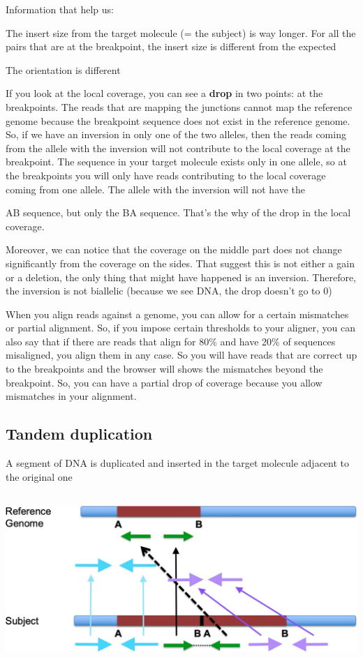 Information that help us:

The insert size from the target molecule (= the subject) is way longer. For all
the pairs that are at the breakpoint, the insert size is different from the
expected

The orientation is different

If you look at the local coverage, you can see a \textbf{drop} in two points: at
the breakpoints. The reads that are mapping the junctions cannot map the
reference genome because the breakpoint sequence does not exist in the reference
genome. So, if we have an inversion in only one of the two alleles, then the
reads coming from the allele with the inversion will not contribute to the local
coverage at the breakpoint. The sequence in your target molecule exists only in
one allele, so at the breakpoints you will only have reads contributing to the
local coverage coming from one allele. The allele with the inversion will not
have the

AB sequence, but only the BA sequence. That's the why of the drop in the local
coverage.

Moreover, we can notice that the coverage on the middle part does not change
significantly from the coverage on the sides. That suggest this is not either a
gain or a deletion, the only thing that might have happened is an inversion.
Therefore, the inversion is not biallelic (because we see DNA, the drop doesn't
go to 0)

When you align reads against a genome, you can allow for a certain mismatches or
partial alignment. So, if you impose certain thresholds to your aligner, you can
also say that if there are reads that align for 80\% and have 20\% of sequences
misaligned, you align them in any case. So you will have reads that are correct
up to the breakpoints and the browser will shows the mismatches beyond the
breakpoint. So, you can have a partial drop of coverage because you allow
mismatches in your alignment.


\hypertarget{tandem-duplication}{%
\subsection{Tandem duplication}\label{tandem-duplication}}


A segment of DNA is duplicated and inserted in the target molecule adjacent to
the original one


\includegraphics[width=6.1113in,height=2.55073in]{image23.jpeg}


